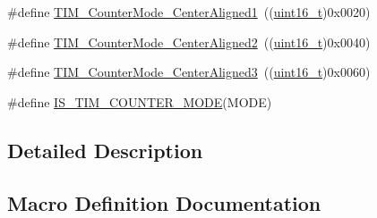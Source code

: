 \begin{DoxyCompactItemize}
\item 
\#define \hyperlink{group___t_i_m___counter___mode_gac07392e9637f8a0d115d4ba9a002ae93}{T\+I\+M\+\_\+\+Counter\+Mode\+\_\+\+Center\+Aligned1}~((\hyperlink{_p_e___types_8h_a1f1825b69244eb3ad2c7165ddc99c956}{uint16\+\_\+t})0x0020)
\item 
\#define \hyperlink{group___t_i_m___counter___mode_ga3793122e4c123a99e46fc2f04acea0d4}{T\+I\+M\+\_\+\+Counter\+Mode\+\_\+\+Center\+Aligned2}~((\hyperlink{_p_e___types_8h_a1f1825b69244eb3ad2c7165ddc99c956}{uint16\+\_\+t})0x0040)
\item 
\#define \hyperlink{group___t_i_m___counter___mode_ga65d9bc01ffa287cd7cf200d08c20a1ce}{T\+I\+M\+\_\+\+Counter\+Mode\+\_\+\+Center\+Aligned3}~((\hyperlink{_p_e___types_8h_a1f1825b69244eb3ad2c7165ddc99c956}{uint16\+\_\+t})0x0060)
\item 
\#define \hyperlink{group___t_i_m___counter___mode_ga9543fec190793e800d5d1b1b853636f5}{I\+S\+\_\+\+T\+I\+M\+\_\+\+C\+O\+U\+N\+T\+E\+R\+\_\+\+M\+O\+DE}(M\+O\+DE)
\end{DoxyCompactItemize}


\subsection{Detailed Description}


\subsection{Macro Definition Documentation}
